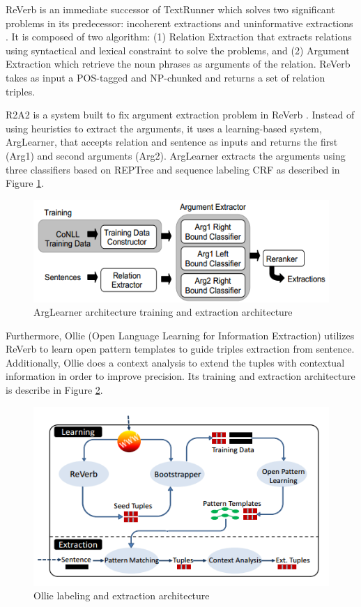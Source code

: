 \documentclass[conference,compsoc]{IEEEtran}
\begin{document}
ReVerb is an immediate successor of TextRunner which solves two significant problems in its predecessor: incoherent extractions and uninformative extractions \cite{fader2011identifying}. It is composed of two algorithm: (1) Relation Extraction that extracts relations using syntactical and lexical constraint to solve the problems, and (2) Argument Extraction which retrieve the noun phrases as arguments of the relation. ReVerb takes as input a POS-tagged and NP-chunked and returns a set of relation triples.

R2A2 is a system built to fix argument extraction problem in ReVerb \cite{etzioni2011open}. Instead of using heuristics to extract the arguments, it uses a learning-based system, ArgLearner, that accepts relation and sentence as inputs and returns the first (Arg1) and second arguments (Arg2). ArgLearner extracts the arguments using three classifiers based on REPTree and sequence labeling CRF as described in Figure \ref{fig_arglearner_architecture}.

\begin{figure}
\centering
\includegraphics[scale=0.5]{arglearner_architecture}
\caption{ArgLearner architecture training and extraction architecture}
\label{fig_arglearner_architecture}
\end{figure}

Furthermore, Ollie (Open Language Learning for Information Extraction)\cite{schmitz2012open} utilizes ReVerb to learn open pattern templates to guide triples extraction from sentence. Additionally, Ollie does a context analysis to extend the tuples with contextual information in order to improve precision. Its training and extraction architecture is describe in Figure \ref{fig_ollie_architecture}.

\begin{figure}
\centering
\includegraphics[scale=0.5]{ollie_architecture}
\caption{Ollie labeling and extraction architecture}
\label{fig_ollie_architecture}
\end{figure}
\end{document}
